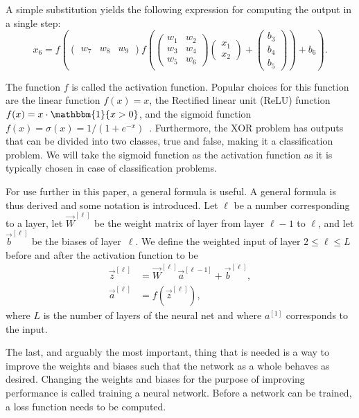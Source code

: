 A simple substitution yields the following expression for computing the output in a single step:
\[
        x_6
    =
    f\left(
    \begin{pmatrix}
            w_7 & w_8 & w_9
        \end{pmatrix}
    f\left(
        \begin{pmatrix}
                w_1 & w_2 \\
                w_3 & w_4 \\
                w_5 & w_6
            \end{pmatrix}
        \begin{pmatrix}
                x_1 \\x_2
            \end{pmatrix}
        +
        \begin{pmatrix}
                b_3 \\b_4\\b_5
            \end{pmatrix}
        \right)
    +
            b_6
    \right).
\]

The function \(f\) is called the activation function.
Popular choices for this function are the linear function \(f(x) = x\), the Rectified linear unit (ReLU) function \(f(x) = x\cdot\mathbbm{1}\{x > 0\} \), and the sigmoid function \(f(x) = \sigma(x) = 1/(1+e^{-x})\)~\cite{Higham2018}.
Furthermore, the XOR problem has outputs that can be divided into two classes, true and false, making it a classification problem.
We will take the sigmoid function as the activation function as it is typically chosen in case of classification problems.

For use further in this paper, a general formula is useful.
A general formula is thus derived and some notation is introduced.
Let \(\ell \) be a number corresponding to a layer, let \(\vec{W}^{[\ell]}\) be the weight matrix of layer from layer \(\ell - 1\) to \(\ell \), and let \(\vec{b}^{[\ell]}\) be the biases of layer~\(\ell \).
We define the weighted input of layer \(2 \leq \ell \leq L \) before and after the activation function to be
\begin{align*}
    \vec{z}^{[\ell]} & = \vec{W}^{[\ell]}\vec{a}^{[\ell - 1]} + \vec{b}^{[\ell]}, \\
    \vec{a}^{[\ell]} & = f\left(\vec{z}^{[\ell]}\right),
\end{align*}
where \(L\) is the number of layers of the neural net and where \(a^{[1]}\) corresponds to the input.

The last, and arguably the most important, thing that is needed is a way to improve the weights and biases such that the network as a whole behaves as desired.
Changing the weights and biases for the purpose of improving performance is called training a neural network.
Before a network can be trained, a loss function needs to be computed.

